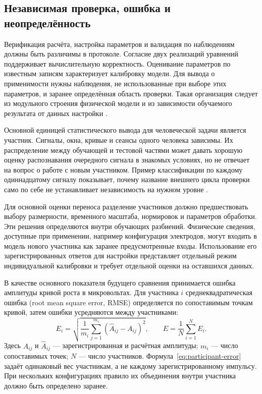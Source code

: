\subsection{Независимая проверка, ошибка и неопределённость}

Верификация расчёта, настройка параметров и валидация по наблюдениям должны быть различимы в протоколе. Согласие двух реализаций уравнений поддерживает вычислительную корректность. Оценивание параметров по известным записям характеризует калибровку модели. Для вывода о применимости нужны наблюдения, не использованные при выборе этих параметров, и заранее определённая область проверки. Такая организация следует из модульного строения физической модели и из зависимости обучаемого результата от данных настройки \cite{s285,ecapmodel}.

Основной единицей статистического вывода для человеческой задачи является участник. Сигналы, окна, кривые и сеансы одного человека зависимы. Их распределение между обучающей и тестовой частями может давать хорошую оценку распознавания очередного сигнала в знакомых условиях, но не отвечает на вопрос о работе с новым участником. Пример классификации по каждому одиннадцатому сигналу показывает, почему название внешнего цикла проверки само по себе не устанавливает независимость на нужном уровне \cite{s105}.

Для основной оценки переноса разделение участников должно предшествовать выбору размерности, временного масштаба, нормировок и параметров обработки. Эти решения определяются внутри обучающих разбиений. Физические сведения, доступные при применении, например конфигурация электродов, могут входить в модель нового участника как заранее предусмотренные входы. Использование его зарегистрированных ответов для настройки представляет отдельный режим индивидуальной калибровки и требует отдельной оценки на оставшихся данных.

В качестве основного показателя будущего сравнения принимается ошибка амплитуды кривой роста в микровольтах. Для участника $i$ среднеквадратическая ошибка (root mean square error, RMSE) определяется по сопоставимым точкам кривой, затем ошибки усредняются между участниками:
\begin{equation}
 E_i=\sqrt{\frac{1}{m_i}\sum_{j=1}^{m_i}
       (\widehat A_{ij}-A_{ij})^2}, \qquad
 E=\frac{1}{N}\sum_{i=1}^{N}E_i.
 \label{eq:participant-error}
\end{equation}
Здесь $A_{ij}$ и $\widehat A_{ij}$ --- зарегистрированная и расчётная амплитуды; $m_i$ --- число сопоставимых точек; $N$ --- число участников. Формула~\eqref{eq:participant-error} задаёт одинаковый вес участникам, а не каждому зарегистрированному импульсу. При нескольких конфигурациях правило их объединения внутри участника должно быть определено заранее.


